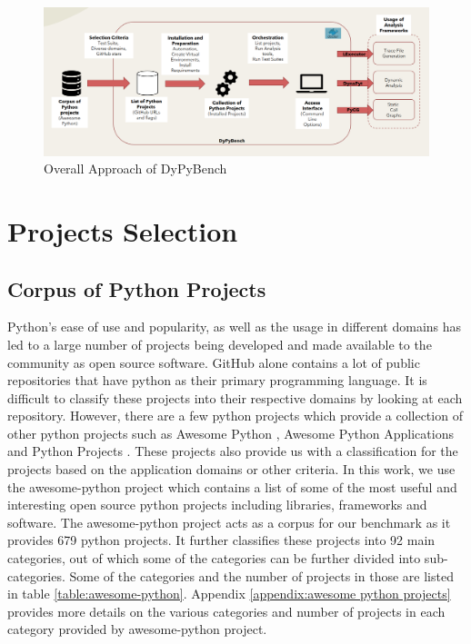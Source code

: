 \begin{figure}[ht]
\centering
\includegraphics[width=1\linewidth]{figures/approach/DyPyBench2.png}
\caption[Approach]{\label{fig:overall_approach}Overall Approach of DyPyBench}
\end{figure}

\section{Projects Selection}
\label{approach:project selection}

\subsection{Corpus of Python Projects}
\label{approach:corpus of python projects}
Python's ease of use and popularity, as well as the usage in different domains has led to a large number of projects being developed and made available to the community as open source software. GitHub alone contains a lot of public repositories that have python as their primary programming language. It is difficult to classify these projects into their respective domains by looking at each repository. However, there are a few python projects which provide a collection of other python projects such as Awesome Python \cite{awesome_python_github}, Awesome Python Applications \cite{awesome_python_applications_github} and Python Projects \cite{python_projects}. These projects also provide us with a classification for the projects based on the application domains or other criteria. In this work, we use the awesome-python project which contains a list of some of the most useful and interesting open source python projects including libraries, frameworks and software. 
The awesome-python project acts as a corpus for our benchmark as it provides 679 python projects. It further classifies these projects into 92 main categories, out of which some of the categories can be further divided into sub-categories. Some of the categories and the number of projects in those are listed in table \ref{table:awesome-python}. 
Appendix \ref{appendix:awesome python projects} provides more details on the various categories and number of projects in each category provided by awesome-python project.

